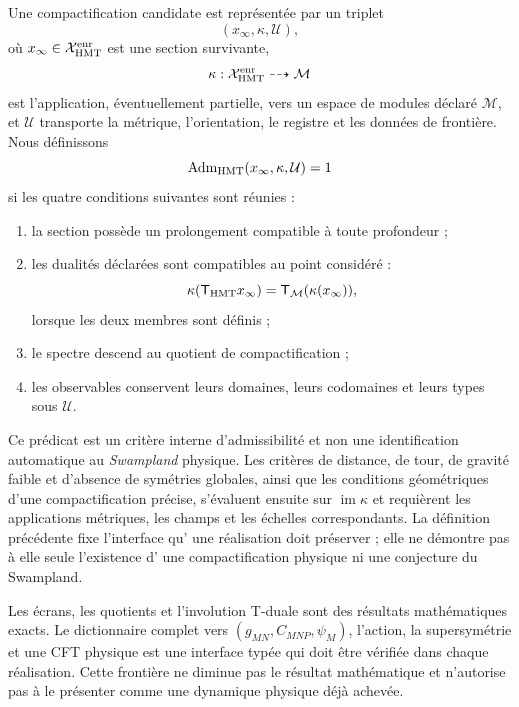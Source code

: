 \begin{definition}
\label{def:admisibilidad-compactificacion-hmt-rev3}
Une compactification candidate est représentée par un triplet
\[
 (x_\infty,\kappa,\mathcal U),
\]
où \(x_\infty\in\mathcal X_{\rm HMT}^{\rm enr}\) est une section
survivante,
\[
 \kappa:\mathcal X_{\rm HMT}^{\rm enr}\dashrightarrow\mathcal M
\]
est l'application, éventuellement partielle, vers un espace de modules déclaré
\(\mathcal M\), et
\(\mathcal U\) transporte la métrique, l'orientation, le registre et les données de frontière.
Nous définissons
\[
 \operatorname{Adm}_{\rm HMT}(x_\infty,\kappa,\mathcal U)=1
\]
si les quatre conditions suivantes sont réunies :
\begin{enumerate}
 \item la section possède un prolongement compatible à toute profondeur ;
 \item les dualités déclarées sont compatibles au point considéré :
       \[
        \kappa(\mathsf T_{\rm HMT}x_\infty)
        =\mathsf T_{\mathcal M}(\kappa(x_\infty)),
       \]
       lorsque les deux membres sont définis ;
 \item le spectre descend au quotient de compactification ;
 \item les observables conservent leurs domaines, leurs codomaines et leurs types sous
       \(\mathcal U\).
\end{enumerate}
\end{definition}

Ce prédicat est un critère interne d'admissibilité et non une
identification automatique au \emph{Swampland} physique. Les critères de
distance, de tour, de gravité faible et d'absence de symétries globales, ainsi que
les conditions géométriques d'une compactification précise, s'évaluent
ensuite sur \(\operatorname{im}\kappa\) et requièrent les applications
métriques, les champs et les échelles correspondants. La définition précédente fixe l'interface qu'
une réalisation doit préserver ; elle ne démontre pas à elle seule l'existence d'
une compactification physique ni une conjecture du Swampland.

\begin{statusbox}[title={Statut de l'interface}]
Les écrans, les quotients et l'involution T-duale sont des résultats
mathématiques exacts. Le dictionnaire complet vers
\((g_{MN},C_{MNP},\psi_M)\), l'action, la supersymétrie et une CFT physique est
une interface typée qui doit être vérifiée dans chaque réalisation. Cette frontière
ne diminue pas le résultat mathématique et n'autorise pas à le présenter comme une dynamique
physique déjà achevée.
\end{statusbox}

